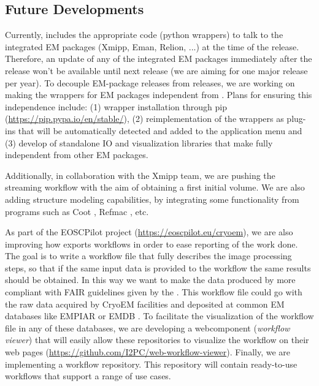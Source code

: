 \subsection{Future Developments}

Currently, \scipion includes the appropriate code (python wrappers) to talk to the integrated EM packages (Xmipp, Eman, Relion, ...) at the time of the release. Therefore, an update of any of the integrated EM packages immediately after the \scipion release won't be available until next \scipion release (we are aiming for one major release per year). To decouple EM-package releases from \scipion releases, we are working on making the wrappers for EM packages  independent from \scipion. Plans for ensuring this independence include: (1) wrapper installation through pip (\url{https://pip.pypa.io/en/stable/}), (2) reimplementation of the wrappers as plug-ins that will be automatically detected and added to the application menu and (3) develop of standalone IO  and visualization libraries that make \scipion fully independent from other EM packages.

Additionally, in collaboration with the Xmipp team, we are pushing the streaming workflow with the aim of obtaining a first initial volume. We are also adding structure modeling capabilities, by integrating some functionality from programs such as Coot \citep{emsley2010:coot}, Refmac \citep{Murshudov1997:refmac}, etc. 

As part of the EOSCPilot project (\url{https://eoscpilot.eu/cryoem}), we are also improving  how \scipion exports workflows in order to ease reporting of the work done. The goal is to write a workflow file that fully describes the image processing steps, so that if the same input data is provided to the workflow the same results should be obtained. In this way we want to make  the data produced by \scipion more compliant with FAIR guidelines given by the \citet{eu2016:fair}. This workflow file could go with the raw data acquired by CryoEM facilities and deposited at common EM databases like EMPIAR or EMDB \citep{Patwardhan2016:databasesEM}. To facilitate the visualization of the workflow file in any of these databases, we are  developing a  webcomponent (\scipion \emph{workflow viewer}) that will easily allow these repositories to visualize the workflow on their web pages (\url{https://github.com/I2PC/web-workflow-viewer}). Finally, we are implementing a workflow repository. This repository will contain ready-to-use workflows that support a range of use cases.
